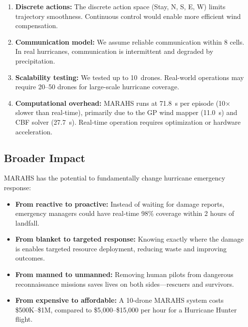 \documentclass[12pt,a4paper,twocolumn]{article}
\begin{document}
\begin{enumerate}[leftmargin=*]
\begin{enumerate}[leftmargin=*]
    \item \textbf{Discrete actions:} The discrete action space (Stay, N, S, E, W) limits trajectory smoothness. Continuous control would enable more efficient wind compensation.

    \item \textbf{Communication model:} We assume reliable communication within 8 cells. In real hurricanes, communication is intermittent and degraded by precipitation.

    \item \textbf{Scalability testing:} We tested up to 10~drones. Real-world operations may require 20--50 drones for large-scale hurricane coverage.

    \item \textbf{Computational overhead:} MARAHS runs at 71.8~s per episode (10$\times$ slower than real-time), primarily due to the GP wind mapper (11.0~s) and CBF solver (27.7~s). Real-time operation requires optimization or hardware acceleration.
\end{enumerate}

\subsection{Broader Impact}
\label{sec:broader_impact}

MARAHS has the potential to fundamentally change hurricane emergency response:

\begin{itemize}[leftmargin=*]
    \item \textbf{From reactive to proactive:} Instead of waiting for damage reports, emergency managers could have real-time 98\% coverage within 2 hours of landfall.
    \item \textbf{From blanket to targeted response:} Knowing exactly where the damage is enables targeted resource deployment, reducing waste and improving outcomes.
    \item \textbf{From manned to unmanned:} Removing human pilots from dangerous reconnaissance missions saves lives on both sides---rescuers and survivors.
    \item \textbf{From expensive to affordable:} A 10-drone MARAHS system costs \$500K--\$1M, compared to \$5,000--\$15,000 per hour for a Hurricane Hunter flight.
\end{itemize}



\end{enumerate}
\end{document}
